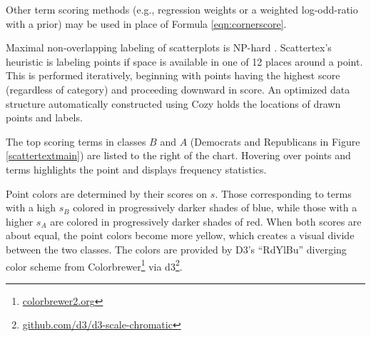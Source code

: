 \documentclass[11pt,a4paper]{article}
\begin{document}
Other term scoring methods (e.g., regression weights or a weighted log-odd-ratio with a prior) may be used in place of Formula \ref{eqn:cornerscore}.

Maximal non-overlapping labeling of scatterplots is NP-hard \cite{Been2007}. Scattertex's heuristic is labeling points if space is available in one of 12 places around a point.  This is performed iteratively, beginning with points having the highest score (regardless of category) and proceeding downward in score.  An optimized data structure automatically constructed using Cozy \cite{cozy} holds the locations of drawn points and labels. 

The top scoring terms in classes $B$ and $A$ (Democrats and Republicans in Figure \ref{scattertextmain}) are listed to the right of the chart.  Hovering over points and terms highlights the point and displays frequency statistics.

Point colors are determined by their scores on $s$.  Those corresponding to terms with a high $s_B$ colored in progressively darker shades of blue, while those with a higher $s_A$ are colored in progressively darker shades of red.  When both scores are about equal, the point colors become more yellow, which creates a visual divide between the two classes.   The colors are provided by D3's ``RdYlBu'' diverging color scheme from Colorbrewer\footnote{\href{http://colorbrewer2.org/}{colorbrewer2.org}} via d3\footnote{\href{https://github.com/d3/d3-scale-chromatic}{github.com/d3/d3-scale-chromatic}}.
\end{document}
